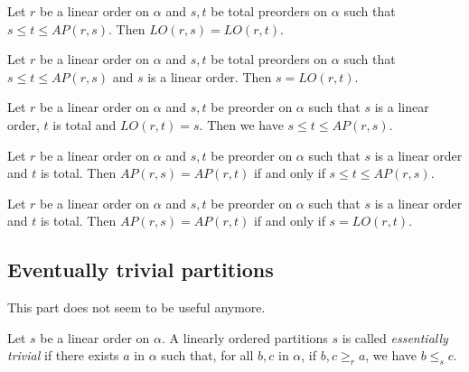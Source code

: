 \begin{sublemma}
Let $r$ be a linear order on $\alpha$ and $s,t$ be total preorders on $\alpha$ such that $s\le t\le AP(r,s)$. Then $LO(r,s)=LO(r,t)$.  

\end{sublemma}


\begin{sublemma}
Let $r$ be a linear order on $\alpha$ and $s,t$ be total preorders on $\alpha$ such that $s\le t\le AP(r,s)$ and $s$ is a linear order. Then $s=LO(r,t)$.  

\end{sublemma}

\begin{sublemma}
Let $r$ be a linear order on $\alpha$ and $s,t$ be preorder on $\alpha$ such that $s$ is a linear order, $t$ is total and $LO(r,t)=s$. Then we have
$s\le t\le AP(r,s)$.

\end{sublemma}

\begin{sublemma}
Let $r$ be a linear order on $\alpha$ and $s,t$ be preorder on $\alpha$ such that $s$ is a linear order and $t$ is total.
Then $AP(r,s)=AP(r,t)$ if and only if $s\le t\le AP(r,s)$.

\end{sublemma}

\begin{sublemma}
Let $r$ be a linear order on $\alpha$ and $s,t$ be preorder on $\alpha$ such that $s$ is a linear order and $t$ is total.
Then $AP(r,s)=AP(r,t)$ if and only if $s=LO(r,t)$.

\end{sublemma}


\subsection{Eventually trivial partitions}

This part does not seem to be useful anymore.

\begin{subdefi}[EventuallyTrivialLinearOrderedPartitions]
Let $s$ be a linear order on $\alpha$. A linearly ordered partitions $s$ is called \emph{essentially trivial} if there exists
$a$ in $\alpha$ such that, for all $b,c$ in $\alpha$, if $b,c\ge_r a$, we have $b\le_s c$.

\end{subdefi}


